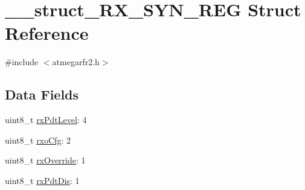 \hypertarget{struct____struct___r_x___s_y_n___r_e_g}{\section{\-\_\-\-\_\-struct\-\_\-\-R\-X\-\_\-\-S\-Y\-N\-\_\-\-R\-E\-G Struct Reference}
\label{struct____struct___r_x___s_y_n___r_e_g}
}


{\ttfamily \#include $<$atmegarfr2.\-h$>$}

\subsection*{Data Fields}
\begin{DoxyCompactItemize}
\item 
uint8\-\_\-t \hyperlink{struct____struct___r_x___s_y_n___r_e_g_a3cb348befbf73dd1cb6278eae7518733}{rx\-Pdt\-Level}\-: 4
\item 
uint8\-\_\-t \hyperlink{struct____struct___r_x___s_y_n___r_e_g_a1ec158f2017b138c6b270b3f02d836f8}{rxo\-Cfg}\-: 2
\item 
uint8\-\_\-t \hyperlink{struct____struct___r_x___s_y_n___r_e_g_a1e6250713d27392559c8b3bf61257b65}{rx\-Override}\-: 1
\item 
uint8\-\_\-t \hyperlink{struct____struct___r_x___s_y_n___r_e_g_a9ff9fc0633b14b6f72fade440e6ab2a2}{rx\-Pdt\-Dis}\-: 1
\end{DoxyCompactItemize}


